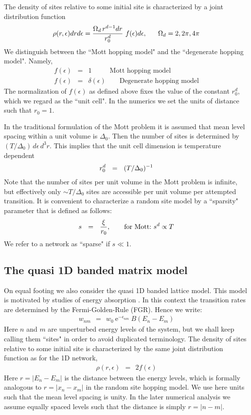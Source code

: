 \documentclass[onecolumn,fleqn,12pt,openany,draft]{book}
\newcommand{\eexp}{\mbox{e}^}
\newcommand{\mylabel}[1]{\label{#1}}
\newcommand{\beq}{\begin{eqnarray}}
\newcommand{\eeq}{\end{eqnarray}}
\newcommand{\be}[1]{\begin{eqnarray}\ifthenelse{#1=-1}
{\nonumber}{\ifthenelse{#1=0}{}{\mylabel{e#1}}}}
\begin{document}
The density of sites relative to some initial site 
is characterized  by a joint distribution function 
%
\be{7}
\rho(r,\epsilon)drd\epsilon = \frac{\Omega_d \, r^{d-1}dr}{r_0^{d}} \ f(\epsilon)d\epsilon,     
\ \ \ \ \ \Omega_d=2,2\pi,4\pi
\eeq
%
We distinguish between the ``Mott hopping model" 
and the ``degenerate hopping model". Namely, 
%
\beq
f(\epsilon) &=& 1  \ \ \ \ \ \ \ \ \ \ \ \ \mbox{Mott hopping model}   \\        
f(\epsilon) &=& \delta(\epsilon) \ \ \ \ \ \ \ \ \ \mbox{Degenerate hopping model}
\eeq
%
The normalization of $f(\epsilon)$ as defined above 
fixes the value of the constant $r_0^d$, which we regard 
as the ``unit cell". 
In the numerics we set the units of distance such that ${r_0=1}$.

In the traditional formulation of the Mott problem 
it is assumed that mean level spacing within a unit volume is $\Delta_0$. 
Then the number of sites is determined by ${(T/\Delta_0) \, d\epsilon \, d^3r}$. 
This implies that the unit cell dimension is temperature dependent
%
\be{100}
r_0^d \ \ = \ \ (T/\Delta_0)^{-1}
\eeq
%
Note that the number of sites per unit volume 
in the Mott problem is infinite, but effectively 
only $\sim T/\Delta_0$ sites are accessible 
per unit volume per attempted transition. 
%
It is convenient to characterize a random 
site model by a ``sparsity" parameter that is defined 
as follows:
%
\be{101}
s \ \ = \ \ \frac{\xi}{r_0}, \ \ \ \ \ \ \text{for Mott:} \ s^d \propto T
\eeq
%
We refer to a network as ``sparse" if $s\ll1$.



\subsection{The quasi 1D banded matrix model}

On equal footing we also consider the quasi 1D banded lattice model.
This model is motivated by studies of energy absorption \cite{slk}.
In this context the transition rates are determined 
by the Fermi-Golden-Rule (FGR). Hence we write:
%
\beq
w_{nm} \ \ = \ \ w_0 \ \eexp{-\epsilon_{nm}} \ B\left(E_n-E_m\right)
\eeq
% 
Here $n$ and $m$ are unperturbed energy levels of the system, 
but we shall keep calling them ``sites" in order to avoid 
duplicated terminology.
The density of sites relative to some initial site 
is characterized by the same joint distribution function
as for the 1D network,  
%
\beq
\rho(r,\epsilon) \ \ = \ \ 2f(\epsilon) 
\eeq 
%
Here $r=|E_n-E_m|$ is the distance between the energy levels, 
which is formally analogous to $r=|x_n-x_m|$ in the random site hopping model.
We use here units such that the mean level spacing is unity.
In the later numerical analysis we assume equally spaced levels 
such that the distance is simply ${r=|n-m|}$. 
\end{document}
